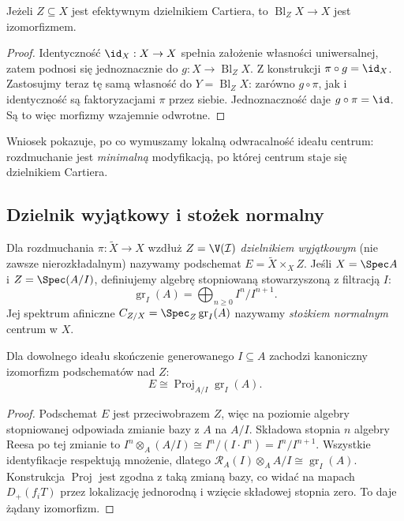 \begin{wniosek}
\label{wn:ga5-cartier-trivial}
Jeżeli $Z\subseteq X$ jest efektywnym dzielnikiem
Cartiera, to $\operatorname{Bl}_Z X\to X$ jest izomorfizmem.
\end{wniosek}
\begin{proof}
Identyczność $\id_X:X\to X$ spełnia założenie własności
uniwersalnej, zatem podnosi się jednoznacznie do
$g:X\to\operatorname{Bl}_Z X$. Z konstrukcji
$\pi\circ g=\id_X$. Zastosujmy teraz tę samą własność
do $Y=\operatorname{Bl}_Z X$: zarówno $g\circ\pi$,
jak i identyczność są faktoryzacjami $\pi$ przez siebie.
Jednoznaczność daje $g\circ\pi=\id$. Są to więc
morfizmy wzajemnie odwrotne.
\end{proof}

Wniosek pokazuje, po co wymuszamy lokalną odwracalność
ideału centrum: rozdmuchanie jest \emph{minimalną}
modyfikacją, po której centrum staje się dzielnikiem Cartiera.

\subsection{Dzielnik wyjątkowy i stożek normalny}

\begin{definicja}
Dla rozdmuchania $\pi:\widetilde X\to X$ wzdłuż
$Z=\V(\mathcal I)$ \emph{dzielnikiem wyjątkowym}
(nie zawsze nierozkładalnym) nazywamy podschemat
$E=\widetilde X\times_X Z$.
Jeśli $X=\Spec A$ i $Z=\Spec(A/I)$, definiujemy
algebrę stopniowaną stowarzyszoną z filtracją $I$:
\[
 \operatorname{gr}_I(A)=\bigoplus_{n\ge0}I^n/I^{n+1}.
\]
Jej spektrum afiniczne
$C_{Z/X}=\Spec_Z\operatorname{gr}_I(A)$
nazywamy \emph{stożkiem normalnym} centrum w $X$.
\end{definicja}

\begin{twierdzenie}
\label{tw:ga5-normalcone}
Dla dowolnego ideału skończenie generowanego $I\subseteq A$
zachodzi kanoniczny izomorfizm podschematów nad $Z$:
\[
 E\cong\operatorname{Proj}_{A/I}\operatorname{gr}_I(A).
\]
\end{twierdzenie}
\begin{proof}
Podschemat $E$ jest przeciwobrazem $Z$, więc na poziomie
algebry stopniowanej odpowiada zmianie bazy z $A$ na
$A/I$. Składowa stopnia $n$ algebry Reesa po tej
zmianie to
$I^n\otimes_A(A/I)\cong I^n/(I\cdot I^n)=I^n/I^{n+1}$.
Wszystkie identyfikacje respektują mnożenie, dlatego
$\mathcal R_A(I)\otimes_A A/I\cong\operatorname{gr}_I(A)$.
Konstrukcja $\operatorname{Proj}$ jest zgodna z taką
zmianą bazy, co widać na mapach
$D_+(f_iT)$ przez lokalizację jednorodną i wzięcie
składowej stopnia zero. To daje żądany izomorfizm.
\end{proof}


